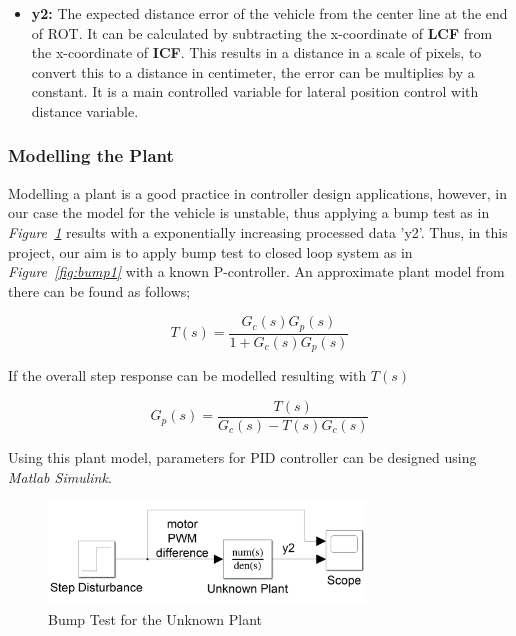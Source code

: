 \documentclass[a4paper,12pt]{article}
\begin{document}
\begin{enumerate}
\begin{itemize}
\item \textbf{y2:} The expected distance error of the vehicle from the center line at the end of ROT. It can be calculated by subtracting the x-coordinate of \textbf{LCF} from the x-coordinate of \textbf{ICF}. This results in a distance in a scale of pixels, to convert this to a distance in centimeter, the error can be multiplies by a constant. It is a main controlled variable for lateral position control with distance variable.



\end{itemize}	 			



\subsubsection*{Modelling the Plant}


Modelling a plant is a good practice in controller design applications, however, in our case the model for the vehicle is unstable, thus applying a bump test as in \textit{Figure~\ref{fig:bump2}} results with a exponentially increasing processed data 'y2'. Thus, in this project, our aim is to apply bump test to closed loop system as in \textit{Figure~\ref{fig:bump1}} with a known P-controller. An approximate plant model from there can be found as follows;


$$ T(s)=\frac{G_c(s)G_p(s)}{1+G_c(s)G_p(s)} $$


If the overall step response can be modelled resulting with $T(s)$


$$\boxed{ G_p(s)=\frac{T(s)}{G_c(s)-T(s)G_c(s)} }$$ 


Using this plant model, parameters for PID controller can be designed using \textit{Matlab Simulink}.


\begin{figure}[h]

\includegraphics[width=0.75\textwidth,center]{images/simulink/modelling2}

\caption{Bump Test for the Unknown Plant \label{fig:bump2} }

\end{figure}



\end{enumerate}
\end{document}
